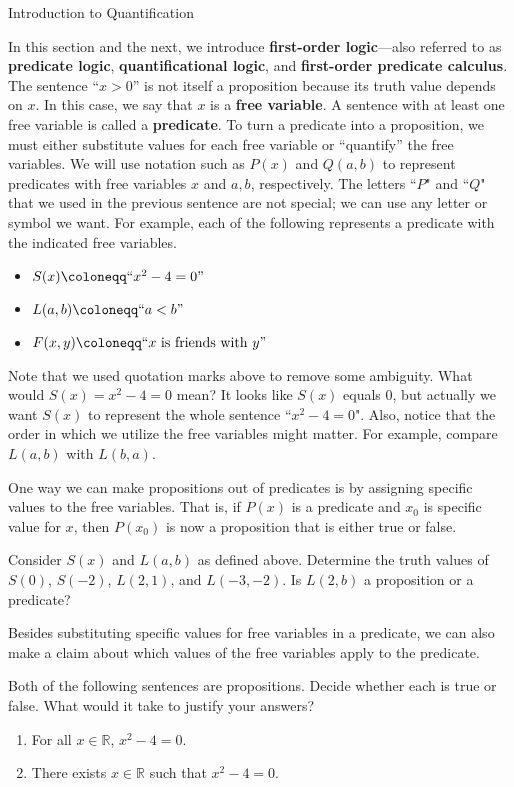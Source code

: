 \begin{section}{Introduction to Quantification}

In this section and the next, we introduce \textbf{first-order logic}---also referred to as \textbf{predicate logic}, \textbf{quantificational logic}, and \textbf{first-order predicate calculus}. The sentence ``$x>0$'' is not itself a proposition because its truth value depends on $x$.  In this case, we say that $x$ is a \textbf{free variable}. A sentence with at least one free variable is called a \textbf{predicate}. To turn a predicate into a proposition, we must either substitute values for each free variable or ``quantify'' the free variables. We will use notation such as $\boxed{P(x)}$ and $\boxed{Q(a,b)}$ to represent predicates with free variables $x$ and $a,b$, respectively. The letters ``$P$" and ``$Q$" that we used in the previous sentence are not special; we can use any letter or symbol we want. For example, each of the following represents a predicate with the indicated free variables.
\begin{itemize}
\item $S(x)\coloneqq ``x^2-4=0"$
\item $L(a,b)\coloneqq ``a<b"$
\item $F(x,y)\coloneqq ``x \mbox{ is friends with } y"$
\end{itemize}
Note that we used quotation marks above to remove some ambiguity.  What would $S(x)=x^2-4=0$ mean?  It looks like $S(x)$ equals 0, but actually we want $S(x)$ to represent the whole sentence ``$x^2-4=0$". Also, notice that the order in which we utilize the free variables might matter.  For example, compare $L(a,b)$ with $L(b,a)$.

One way we can make propositions out of predicates is by assigning specific values to the free variables.  That is, if $P(x)$ is a predicate and $x_0$ is specific value for $x$, then $P(x_0)$ is now a proposition that is either true or false.

\begin{problem}
Consider $S(x)$ and $L(a,b)$ as defined above. Determine the truth values of $S(0)$, $S(-2)$, $L(2,1)$, and $L(-3,-2)$. Is $L(2,b)$ a proposition or a predicate?
\end{problem}

Besides substituting specific values for free variables in a predicate, we can also make a claim about which values of the free variables apply to the predicate.

\begin{problem}\label{ex:quantified predicates}
Both of the following sentences are propositions. Decide whether each is true or false. What would it take to justify your answers?
\begin{enumerate}[label=\textrm{(\alph*)}]
\item For all $x\in\mathbb{R}$, $x^2-4=0$.
\item There exists $x\in\mathbb{R}$ such that $x^2-4=0$.
\end{enumerate}
\end{problem}


\end{section}
